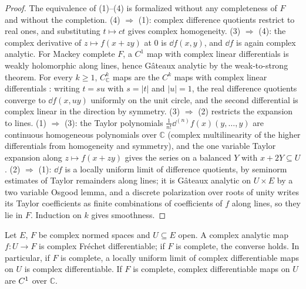 \begin{proof}
  \leanok
  The equivalence of (1)--(4) is formalized without any completeness of $F$ and without the
  completion. (4) $\Rightarrow$ (1): complex difference quotients restrict to real ones, and
  substituting $t \mapsto ct$ gives complex homogeneity. (3) $\Rightarrow$ (4): the complex
  derivative of $z \mapsto f(x + zy)$ at $0$ is $\dd f(x, y)$, and $\dd f$ is again complex
  analytic. For Mackey complete $F$, a $C^1$ map with complex linear differentials is weakly
  holomorphic along lines, hence Gâteaux analytic by the weak-to-strong theorem. For every
  $k \geq 1$, $C^k_{\mathbb{C}}$ maps are the $C^k$ maps with complex linear differentials
  \cite[Lemma~1.4.17]{GN26}: writing $t = su$ with $s = |t|$ and $|u| = 1$, the real difference
  quotients converge to $\dd f(x, uy)$ uniformly on the unit circle, and the second differential
  is complex linear in the direction by symmetry. (3) $\Rightarrow$ (2) restricts
  the expansion to lines. (1) $\Rightarrow$ (3): the Taylor polynomials
  $\frac{1}{n!}\dd^{(n)} f(x)(y, \dots, y)$ are continuous homogeneous polynomials over
  $\mathbb{C}$ (complex multilinearity of the higher differentials from homogeneity and symmetry),
  and the one variable Taylor expansion along $z \mapsto f(x + zy)$ gives the series on a balanced
  $Y$ with $x + 2Y \subseteq U$. (2) $\Rightarrow$ (1): $\dd f$ is a locally uniform limit of
  difference quotients, by seminorm estimates of Taylor remainders along lines; it is Gâteaux
  analytic on $U \times E$ by a two variable Osgood lemma, and a discrete polarization over roots of
  unity writes its Taylor coefficients as finite combinations of coefficients of $f$ along lines,
  so they lie in $F$. Induction on $k$ gives smoothness.
\end{proof}

\begin{theorem}
  \label{thm:banach-holomorphic}
  \leanok
  Let $E$, $F$ be complex normed spaces and $U \subseteq E$ open. A complex analytic map
  $f \colon U \to F$ is complex Fréchet differentiable; if $F$ is complete, the converse holds. In
  particular, if $F$ is complete, a locally uniform limit of complex differentiable maps on $U$ is
  complex differentiable. If $F$ is complete, complex differentiable maps on $U$ are $C^{1}$
  over $\mathbb{C}$.
\end{theorem}

